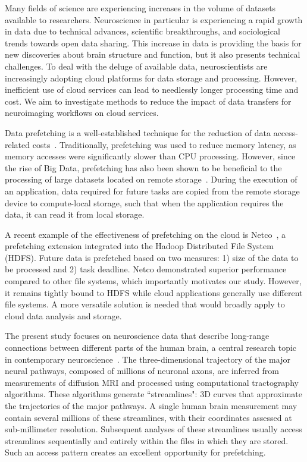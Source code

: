 Many fields of science are experiencing increases in the volume of datasets available to researchers. Neuroscience in particular is experiencing a rapid growth in data due to technical advances, 
scientific breakthroughs, and sociological trends towards open data sharing. This increase in data is providing the basis for new discoveries about brain structure and function, but it also presents technical challenges. To deal with the deluge of available data, neuroscientists are increasingly adopting cloud platforms for data storage and processing. However, inefficient use of cloud services can lead
to needlessly longer processing time and cost. We aim to investigate
methods to reduce the impact of data transfers for
neuroimaging workflows on cloud services.

Data prefetching
is a well-established technique for the reduction of data access-related costs~\cite{callahan1991software, mowry1992design,
klaiber1991architecture}. Traditionally, prefetching was
used to reduce memory latency, as memory accesses were significantly slower than CPU processing. However, since the rise of Big Data,
prefetching has also been shown to be beneficial to the processing of large
datasets located on remote storage~\cite{yildiz2018improving}. During the
execution of an application, data required for future tasks are
copied from the remote storage device to compute-local storage, such that
when the application requires the data, it can read it from local
storage.

A recent example of the effectiveness of prefetching on the cloud is Netco~\cite{jalaparti2018netco}, a prefetching extension
integrated into the Hadoop Distributed File System (HDFS). Future data is prefetched based on two measures: 1) size of the
data to be processed and 2) task deadline.  Netco demonstrated superior performance compared to other file systems, which importantly motivates our study. However, it remains tightly bound to HDFS while cloud applications generally use different file systems. A more versatile solution is needed that would broadly apply to cloud data analysis and storage.

The present study focuses on neuroscience data that describe long-range
connections between different parts of the human brain, a central research topic in contemporary
neuroscience~\cite{bassett_network_2017}. The three-dimensional trajectory
of the major neural pathways, composed of millions of neuronal axons, are
inferred from measurements of diffusion MRI and processed using computational tractography algorithms. These
algorithms generate ``streamlines": 3D curves that approximate the
trajectories of the major pathways. A single human brain measurement may
contain several millions of these streamlines, with their coordinates
assessed at sub-millimeter resolution. Subsequent analyses of these
streamlines usually access
streamlines sequentially and entirely within the files in which they are stored. Such an access pattern creates an excellent opportunity for prefetching.


